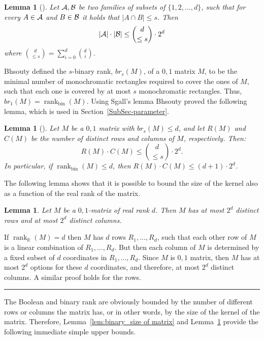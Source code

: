 \documentclass[11pt]{article}
\newtheorem{lemma}[theorem]{Lemma}
\newcommand{\qedsymb}{\hfill{\rule{2mm}{2mm}}}
\renewenvironment{proof}[1][]{\begin{trivlist}
\item[\hspace{\labelsep}{\bf\noindent Proof#1:\/}] }{\qedsymb\end{trivlist}}
\newcommand{\rank}{\mathop{\mathrm{rank}}}
\newcommand{\Rbin}{{\rank}_{\mathrm{bin}}}
\newcommand{\Rreal}{{\rank}_\mathbb{R}}
\begin{document}
\begin{lemma}[\cite{sgall1999bounds}]
Let $\cal A,\cal B$ be two families of subsets of $\{1,2,...,d\}$, such that for every $A \in \cal A$
and $B \in \cal B$ it holds that $|A \cap B| \leq s$. Then
$$|{\cal A}| \cdot |{\cal B}| \leq {d \choose \leq s }\cdot 2^d$$
where ${d \choose \leq s} = \sum_{i = 0}^d {d \choose i}$.
\end{lemma}

Bhsouty defined the $s$-binary rank, $br_s(M)$, of a $0,1$ matrix $M$, to be the minimal number of monochromatic rectangles
required to cover the ones of $M$, such that each one is covered by at most $s$ monochromatic rectangles.
Thus, $br_1(M)  = \Rbin(M)$. Using Sgall's lemma Bhsouty proved the following lemma, which is used in Section~\ref{SubSec-parameter}.

\begin{lemma}[\cite{bshouty2023property}]
\label{lem-product-rows-cols}
Let $M$ be a $0,1$ matrix with $br_s(M) \leq d$, and let $R(M)$ and $C(M)$ be the number of distinct rows and columns of $M$, respectively. Then:
$$
R(M) \cdot C(M) \leq {d \choose \leq s }\cdot 2^d.
$$
In particular, if $\Rbin(M) \leq d$, then $R(M)\cdot C(M) \leq (d+1)\cdot 2^d$.
\end{lemma}

The following lemma shows that it is possible to bound the size of the  kernel  also as a function of the real rank of the matrix.

\begin{lemma}
\label{clm:real_size of matrix}
Let $M$ be a $0,1$-matrix of real rank $d$. Then $M$ has at most $2^d$ distinct rows and at most $2^d$ distinct columns.
\end{lemma}
\begin{proof}
If $\Rreal(M) = d$ then $M$ has $d$ rows $R_1,...,R_d$, such that each other row of $M$ is a linear combination of $R_1,...,R_d$.
But then each column of $M$ is determined by a fixed subset of $d$ coordinates in $R_1,...,R_d$.
Since $M$ is $0,1$ matrix, then $M$ has at most $2^d$ options for these $d$ coordinates, and therefore, at most $2^d$ distinct columns.
A similar proof holds for the rows.
\end{proof}

The Boolean and binary rank are obviously bounded by the number of different rows or columns the matrix has, or in other words, by the size of the kernel of the matrix.
Therefore, Lemma~\ref{lem:binary_size of matrix} and Lemma~\ref{clm:real_size of matrix} provide the following immediate simple upper bounds.
\end{document}
